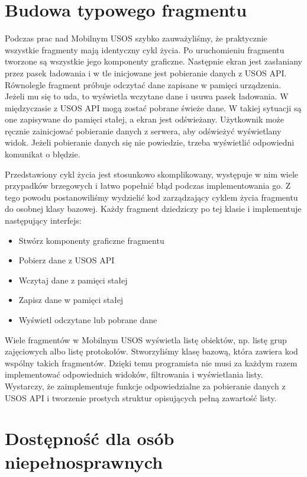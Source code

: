 \documentclass{pracamgr}
\begin{document}
\section{Budowa typowego fragmentu}

Podczas prac nad Mobilnym USOS szybko zauważyliśmy, że praktycznie wszystkie
fragmenty mają identyczny cykl życia. Po uruchomieniu fragmentu tworzone są
wszystkie jego komponenty graficzne. Następnie ekran jest zasłaniany przez pasek
ładowania i w tle inicjowane jest pobieranie danych z USOS API. Równolegle fragment
próbuje odczytać dane zapisane w pamięci urządzenia. Jeżeli mu się to uda, to
wyświetla wczytane dane i usuwa pasek ładowania. W międzyczasie z USOS API mogą
zostać pobrane świeże dane. W takiej sytuacji są one zapisywane do pamięci stałej,
a ekran jest odświeżany. Użytkownik może ręcznie zainicjować pobieranie danych z
serwera, aby odświeżyć wyświetlany widok. Jeżeli pobieranie danych się nie powiedzie,
trzeba wyświetlić odpowiedni komunikat o błędzie.

Przedstawiony cykl życia jest stosunkowo skomplikowany, występuje w nim wiele
przypadków brzegowych i łatwo popełnić błąd podczas implementowania go. Z tego
powodu postanowiliśmy wydzielić kod zarządzający cyklem życia fragmentu do osobnej
klasy bazowej. Każdy fragment dziedziczy po tej klasie i implementuje następujący
interfejs:
\begin{itemize}
	\item Stwórz komponenty graficzne fragmentu
	\item Pobierz dane z USOS API
	\item Wczytaj dane z pamięci stałej
	\item Zapisz dane w pamięci stałej
	\item Wyświetl odczytane lub pobrane dane
\end{itemize}

Wiele fragmentów w Mobilnym USOS wyświetla listę obiektów, np. listę grup zajęciowych
albo listę protokołów. Stworzyliśmy klasę bazową, która zawiera kod wspólny takich
fragmentów. Dzięki temu programista nie musi za każdym razem implementować odpowiednich
widoków, filtrowania i wyświetlania listy. Wystarczy, że zaimplementuje funkcje
odpowiedzialne za pobieranie danych z USOS API i tworzenie prostych struktur
opisujących pełną zawartość listy.

\section{Dostępność dla osób niepełnosprawnych}
\end{document}
